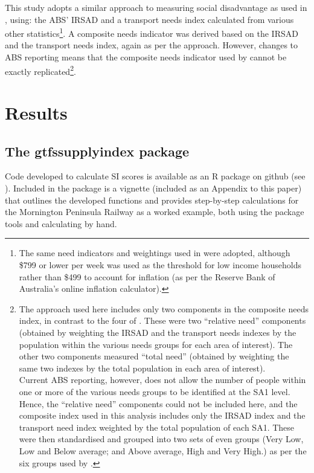 \documentclass[preprint, 3p,
authoryear]{elsarticle} %
\begin{document}
This study adopts a similar approach to measuring social disadvantage as
used in \citet{currie2010identifying}, using: the ABS' IRSAD and a
transport needs index calculated from various other
statistics\footnote{The same need indicators and weightings used in
  \citet{currie2010identifying} were adopted, although \$799 or lower
  per week was used as the threshold for low income households rather
  than \$499 to account for inflation (as per the Reserve Bank of
  Australia's online inflation calculator).}. A composite needs
indicator was derived based on the IRSAD and the transport needs index,
again as per the \citet{currie2010identifying} approach. However,
changes to ABS reporting means that the composite needs indicator used
by \citet{currie2010identifying} cannot be exactly
replicated\footnote{The approach used here includes only two components
  in the composite needs index, in contrast to the four of
  \citet{currie2010identifying}. These were two ``relative need''
  components (obtained by weighting the IRSAD and the transport needs
  indexes by the population within the various needs groups for each
  area of interest). The other two components measured ``total need''
  (obtained by weighting the same two indexes by the total population in
  each area of interest).\\
  Current ABS reporting, however, does not allow the number of people
  within one or more of the various needs groups to be identified at the
  SA1 level. Hence, the ``relative need'' components could not be
  included here, and the composite index used in this analysis includes
  only the IRSAD index and the transport need index weighted by the
  total population of each SA1. These were then standardised and grouped
  into two sets of even groups (Very Low, Low and Below average; and
  Above average, High and Very High.) as per the six groups used by
  \citet{currie2010identifying}.}.

\section{Results}\label{results}

\subsection{The gtfssupplyindex
package}\label{the-gtfssupplyindex-package}

Code developed to calculate SI scores is available as an R package on
github (see \citet{gtfssupplyindex_github}). Included in the package is
a vignette (included as an Appendix to this paper) that outlines the
developed functions and provides step-by-step calculations for the
Mornington Peninsula Railway as a worked example, both using the package
tools and calculating by hand.
\end{document}
